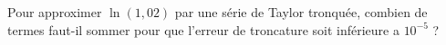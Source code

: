 
\begin{exercice}\label{exoSerieQuatre0006}

Pour approximer $\ln(1,02)$  par une série de Taylor tronquée, combien de termes faut-il sommer pour que l'erreur de troncature soit inférieure a $10^{-5}$ ?


\end{exercice}
